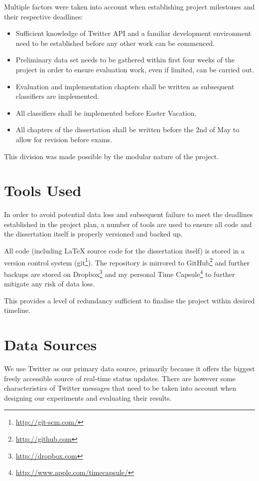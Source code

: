 Multiple factors were taken into account when establishing project milestones and their respective deadlines:

\begin{itemize}
  \item Sufficient knowledge of Twitter API and a familiar development environment need to be established before any other work can be commenced.
  \item Preliminary data set needs to be gathered within first four weeks of the project in order to ensure evaluation work, even if limited, can be carried out.
  \item Evaluation and implementation chapters shall be written as subsequent classifiers are implemented.
  \item All classifiers shall be implemented before Easter Vacation.
  \item All chapters of the dissertation shall be written before the 2nd of May to allow for revision before exams.
\end{itemize}

This division was made possible by the modular nature of the project.

\section{Tools Used}

In order to avoid potential data loss and subsequent failure to meet the deadlines established in the project plan, a number of tools are used to ensure all code and the dissertation itself is properly versioned and backed up.

All code (including {\LaTeX} source code for the dissertation itself) is stored in a version control system (git\footnote{\url{http://git-scm.com/}}). The repository is mirrored to GitHub\footnote{\url{http://github.com}} and further backups are stored on Dropbox\footnote{\url{http://dropbox.com}} and my personal Time Capsule\footnote{\url{http://www.apple.com/timecapsule/}} to further mitigate any risk of data loss.

This provides a level of redundancy sufficient to finalise the project within desired timeline.

\section{Data Sources}

We use Twitter as our primary data source, primarily because it offers the biggest freely accessible source of real-time status updates.
There are however some characteristics of Twitter messages that need to be taken into account when designing our experiments and evaluating their results.

